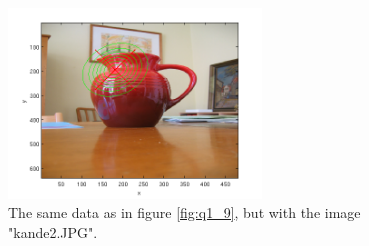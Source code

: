 \documentclass[a4paper, 10pt, final]{article}
\begin{document}
\begin{figure}[!htpb]
  \centering
  \includegraphics[width=0.6\textwidth]{images/kande2.png}
  \caption{The same data as in figure \ref{fig:q1_9}, but with the image "kande2.JPG".}
  \label{fig:q1_10}
\end{figure}


\newpage
\subsection*{\label{text:Code}}




%
%
\end{document}
